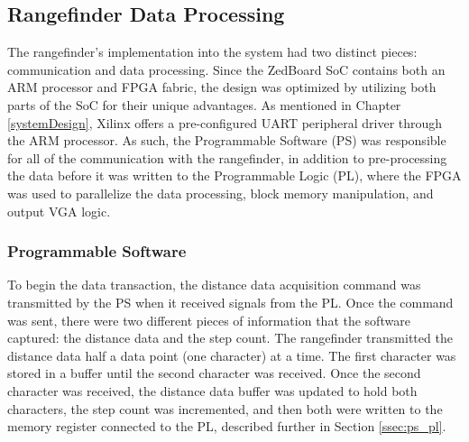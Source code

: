 \subsection{Rangefinder Data Processing}
The rangefinder's implementation into the system had two distinct pieces: communication and data processing. Since the ZedBoard SoC contains both an ARM processor and FPGA fabric, the design was optimized by utilizing both parts of the SoC for their unique advantages. As mentioned in Chapter \ref{systemDesign}, Xilinx offers a pre-configured UART peripheral driver through the ARM processor. As such, the Programmable Software (PS) was responsible for all of the communication with the rangefinder, in addition to pre-processing the data before it was written to the Programmable Logic (PL), where the FPGA was used to parallelize the data processing, block memory manipulation, and output VGA logic.

\subsubsection{Programmable Software}
To begin the data transaction, the distance data acquisition command was transmitted by the PS when it received signals from the PL. Once the command was sent, there were two different pieces of information that the software captured: the distance data and the step count. The rangefinder transmitted the distance data half a data point (one character) at a time. The first character was stored in a buffer until the second character was received. Once the second character was received, the distance data buffer was updated to hold both characters, the step count was incremented, and then both were written to the memory register connected to the PL, described further in Section \ref{ssec:ps_pl}.


